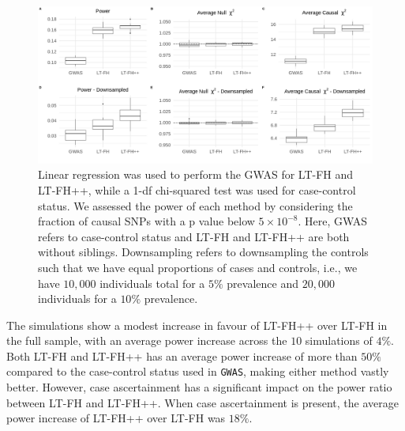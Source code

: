\begin{figure}[h]
	\includegraphics[width=\textwidth]{results/boxplot_05prev_both.png}
	\caption[Simulation results for a $ 5\% $ prevalence, with and without downsampling of controls]{Linear regression was used to perform the GWAS for LT-FH and LT-FH++, while a 1-df chi-squared test was used for case-control status. We assessed the power of each method by considering the fraction of causal SNPs with a p value below $ 5 \times 10^{-8} $. Here, GWAS refers to case-control status and LT-FH and LT-FH++ are both without siblings. Downsampling refers to downsampling the controls such that we have equal proportions of cases and controls, i.e., we have $ 10,000 $ individuals total for a $ 5\% $ prevalence and $ 20,000 $ individuals for a $ 10\% $ prevalence.}
	\label{fig:LTFHppSimulationResults}
\end{figure}

The simulations show a modest increase in favour of LT-FH++ over LT-FH in the full sample, with an average power increase across the $ 10 $ simulations of $ 4\% $. Both LT-FH and LT-FH++ has an average power increase of more than $ 50\% $ compared to the case-control status used in \texttt{GWAS}, making either method vastly better. However, case ascertainment has a significant impact on the power ratio between LT-FH and LT-FH++. When case ascertainment is present, the average power increase of LT-FH++ over LT-FH was $ 18\% $.

\newpage

